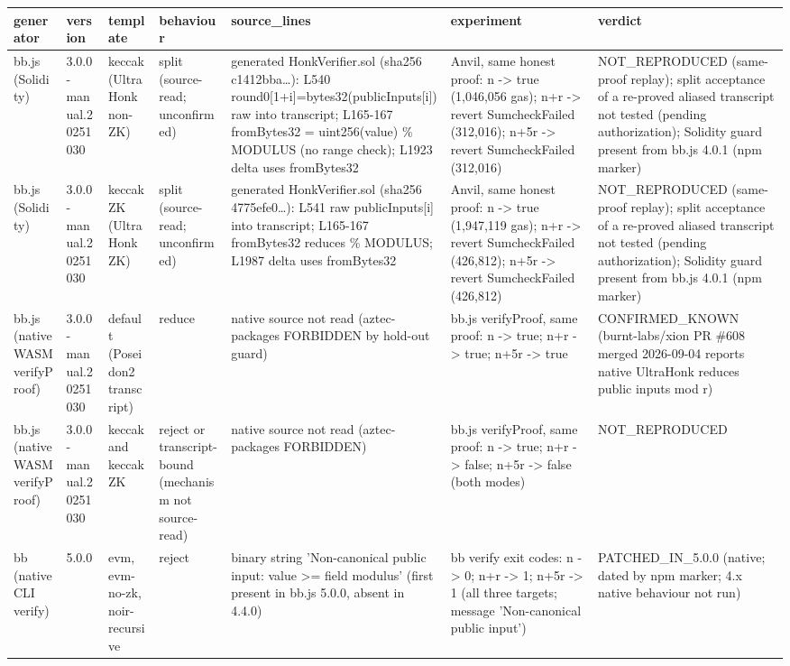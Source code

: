 \begin{tabular}{lllllll}
\toprule
generator & version & template & behaviour & source\_lines & experiment & verdict \\
\midrule
bb.js (Solidity) & 3.0.0-manual.20251030 & keccak (UltraHonk non-ZK) & split (source-read; unconfirmed) & generated HonkVerifier.sol (sha256 c1412bba…): L540 round0[1+i]=bytes32(publicInputs[i]) raw into transcript; L165-167 fromBytes32 = uint256(value) \% MODULUS (no range check); L1923 delta uses fromBytes32 & Anvil, same honest proof: n -> true (1,046,056 gas); n+r -> revert SumcheckFailed (312,016); n+5r -> revert SumcheckFailed (312,016) & NOT\_REPRODUCED (same-proof replay); split acceptance of a re-proved aliased transcript not tested (pending authorization); Solidity guard present from bb.js 4.0.1 (npm marker) \\
bb.js (Solidity) & 3.0.0-manual.20251030 & keccakZK (UltraHonk ZK) & split (source-read; unconfirmed) & generated HonkVerifier.sol (sha256 4775efe0…): L541 raw publicInputs[i] into transcript; L165-167 fromBytes32 reduces \% MODULUS; L1987 delta uses fromBytes32 & Anvil, same honest proof: n -> true (1,947,119 gas); n+r -> revert SumcheckFailed (426,812); n+5r -> revert SumcheckFailed (426,812) & NOT\_REPRODUCED (same-proof replay); split acceptance of a re-proved aliased transcript not tested (pending authorization); Solidity guard present from bb.js 4.0.1 (npm marker) \\
bb.js (native WASM verifyProof) & 3.0.0-manual.20251030 & default (Poseidon2 transcript) & reduce & native source not read (aztec-packages FORBIDDEN by hold-out guard) & bb.js verifyProof, same proof: n -> true; n+r -> true; n+5r -> true & CONFIRMED\_KNOWN (burnt-labs/xion PR \#608 merged 2026-09-04 reports native UltraHonk reduces public inputs mod r) \\
bb.js (native WASM verifyProof) & 3.0.0-manual.20251030 & keccak and keccakZK & reject or transcript-bound (mechanism not source-read) & native source not read (aztec-packages FORBIDDEN) & bb.js verifyProof, same proof: n -> true; n+r -> false; n+5r -> false (both modes) & NOT\_REPRODUCED \\
bb (native CLI verify) & 5.0.0 & evm, evm-no-zk, noir-recursive & reject & binary string 'Non-canonical public input: value >= field modulus' (first present in bb.js 5.0.0, absent in 4.4.0) & bb verify exit codes: n -> 0; n+r -> 1; n+5r -> 1 (all three targets; message 'Non-canonical public input') & PATCHED\_IN\_5.0.0 (native; dated by npm marker; 4.x native behaviour not run) \\

\end{tabular}
